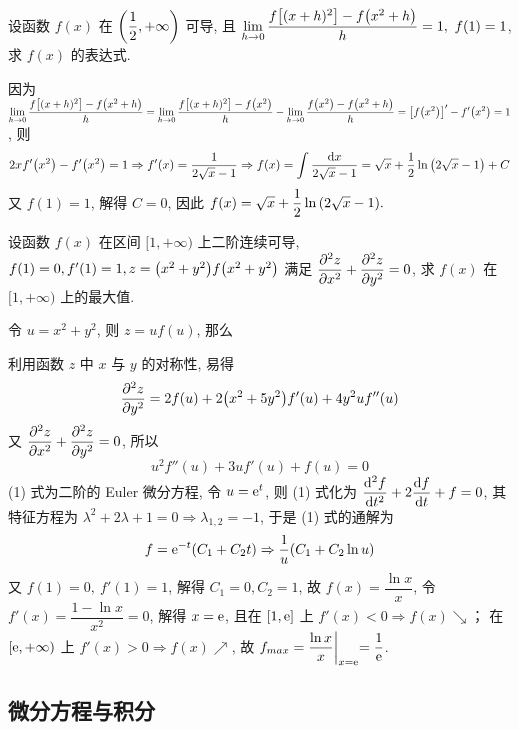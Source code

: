 \begin{example}
    设函数 $f(x)$ 在 $\qty(\dfrac{1}{2},+\infty)$ 可导, 且 $\displaystyle\lim_{h\to0}\dfrac{f\qty[(x+h)^2]-f\qty(x^2+h)}{h}=1,~f(1)=1$, 求 $f(x)$ 的表达式.
\end{example}
\begin{solution}
    因为 $\displaystyle\lim_{h\to0}\dfrac{f\qty[(x+h)^2]-f\qty(x^2+h)}{h}=\lim_{h\to0}\dfrac{f\qty[(x+h)^2]-f\qty(x^2)}{h}-\lim_{h\to0}\dfrac{f\qty(x^2)-f\qty(x^2+h)}{h}=\qty[f\qty(x^2)]'-f'\qty(x^2)=1$, 则
    $$2xf'\qty(x^2)-f'\qty(x^2)=1\Rightarrow f'(x)=\dfrac{1}{2\sqrt{x}-1}\Rightarrow f(x)=\int\dfrac{\dd x}{2\sqrt{x}-1}=\sqrt{x}+\dfrac{1}{2}\ln\qty(2\sqrt{x}-1)+C$$
    又 $f(1)=1$, 解得 $C=0$, 因此 $f(x)=\sqrt{x}+\dfrac{1}{2}\ln\qty(2\sqrt{x}-1).$
\end{solution}

\begin{example}
    设函数 $f(x)$ 在区间 $[1,+\infty)$ 上二阶连续可导, $f(1)=0,f'(1)=1,z=\qty(x^2+y^2)f\qty(x^2+y^2)$
    满足 $\displaystyle \pdv[2]{z}{x}+\pdv[2]{z}{y}=0$, 求 $f(x)$ 在 $[1,+\infty)$ 上的最大值.
\end{example}
\begin{solution}
    令 $u=x^2+y^2$, 则 $z=uf(u)$, 那么
    利用函数 $z$ 中 $x$ 与 $y$ 的对称性, 易得
    $$\pdv[2]{z}{y}=2f(u)+2\qty(x^2+5y^2)f'(u)+4y^2uf''(u)$$
    又 $\displaystyle \pdv[2]{z}{x}+\pdv[2]{z}{y}=0$, 所以
    \begin{equation*}
        u^2f''(u)+3uf'(u)+f(u)=0
        \tag{1}
    \end{equation*}
    (1) 式为二阶的 Euler 微分方程, 令 $u=\mathrm{e} ^t$, 则
    (1) 式化为 $\displaystyle \dv[2]{f}{t}+2\dv{f}{t}+f=0$, 其特征方程为 $\lambda^2+2\lambda+1=0\Rightarrow \lambda_{1,2}=-1$, 于是 (1) 式的通解为
    $$f=\mathrm{e} ^{-t}(C_1+C_2t)\Rightarrow \dfrac{1}{u}(C_1+C_2\ln u)$$
    又 $f(1)=0,~f'(1)=1$, 解得 $C_1=0,C_2=1$, 故 $f(x)=\dfrac{\ln x}{x}$, 令 $f'(x)=\dfrac{1-\ln x}{x^2}=0$, 解得 $x=\mathrm{e} $, 且在 $[1,\mathrm{e} ]$ 上 $f'(x)<0\Rightarrow f(x)\searrow$；
    在 $[\mathrm{e} ,+\infty)$ 上 $f'(x)>0\Rightarrow f(x)\nearrow$, 故 $f_{max}=\dfrac{\ln x}{x}\biggl |_{x=\mathrm{e} }=\dfrac{1}{\mathrm{e} }$.
\end{solution}

\subsection{微分方程与积分}

